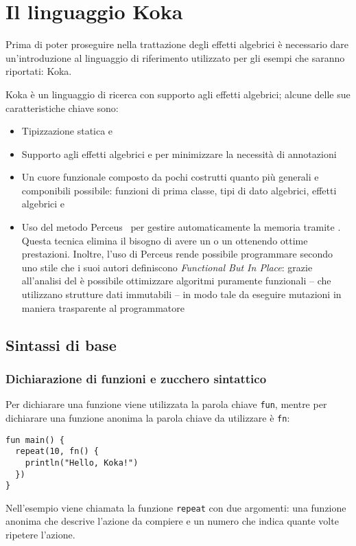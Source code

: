 \section{Il linguaggio Koka}
Prima di poter proseguire nella trattazione degli effetti algebrici è necessario dare un'introduzione al linguaggio di riferimento utilizzato per gli esempi che saranno riportati: Koka.

Koka è un linguaggio di ricerca con supporto agli effetti algebrici; alcune delle sue caratteristiche chiave sono:
\begin{itemize}
  \item Tipizzazione statica e 
  \item Supporto agli effetti algebrici e  per minimizzare la necessità di annotazioni
  \item Un cuore funzionale composto da pochi costrutti quanto più generali e componibili possibile: funzioni di prima classe, tipi di dato algebrici, effetti algebrici e 
  \item Uso del metodo Perceus~\cite{cit:perceus-garbage-free-reference-counting-with-reuse} per gestire automaticamente la memoria tramite . Questa tecnica elimina il bisogno di avere un  o un  ottenendo ottime prestazioni. Inoltre, l'uso di Perceus rende possibile programmare secondo uno stile che i suoi autori definiscono \emph{Functional But In Place}: grazie all'analisi del  è possibile ottimizzare algoritmi puramente funzionali -- che utilizzano strutture dati immutabili -- in modo tale da eseguire mutazioni  in maniera trasparente al programmatore~\cite{cit:koka-benchmarks}
\end{itemize}

\subsection{Sintassi di base}
\subsubsection{Dichiarazione di funzioni e zucchero sintattico}
Per dichiarare una funzione viene utilizzata la parola chiave \lstinline{fun}, mentre per dichiarare una funzione anonima la parola chiave da utilizzare è \lstinline{fn}:
\begin{lstlisting}[language=koka]
fun main() {
  repeat(10, fn() {
    println("Hello, Koka!")
  })
}
\end{lstlisting}
Nell'esempio viene chiamata la funzione \lstinline{repeat} con due argomenti: una funzione anonima che descrive l'azione da compiere e un numero che indica quante volte ripetere l'azione.

